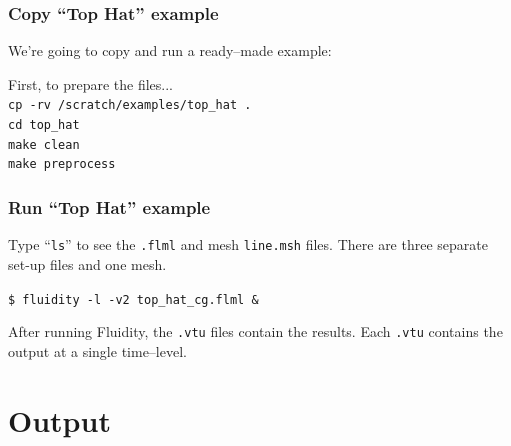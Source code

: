 \documentclass[12pt]{beamer}
\begin{document}


\begin{frame}
    \frametitle{Copy ``Top Hat'' example}

We're going to copy and run a ready--made example:

\vspace{5mm}
First, to prepare the files...\\
{\tt cp -rv /scratch/examples/top\_hat .}\\
{\tt cd top\_hat}\\
{\tt make clean}\\
{\tt make preprocess}

\end{frame}

\begin{frame}
    \frametitle{Run ``Top Hat'' example}

Type ``{\tt ls}'' to see the {\tt .flml} and mesh {\tt line.msh} files.
There are three separate set-up files and one mesh.

\vspace{5mm}
{\tt \$ fluidity -l -v2 top\_hat\_cg.flml \&}\\
\vspace{5mm}

After running Fluidity, the {\tt .vtu} files contain the results. Each {\tt .vtu} contains the output at a single time--level.

\end{frame}

\section{Output}
\end{document}
